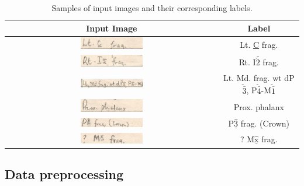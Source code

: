 \documentclass{article}
\begin{document}
\begin{table}[h!]
    \centering
    \begin{tabular}{|c|c|}
        \hline
        \textbf{Input Image} & \textbf{Label} \\
        \hline
        \includegraphics[width=0.3\textwidth]{../images/data_samples/canine.png} & Lt. \underline{C} frag. \\
        \hline
        \includegraphics[width=0.3\textwidth]{../images/data_samples/lowjawincisor.png} & Rt. I$\bar{\check{2}}$ frag. \\
        \hline
        \includegraphics[width=0.3\textwidth]{../images/data_samples/multipleteeth.png} & Lt. Md. frag. wt dP$\check{\bar{3}}$, P$\check{\bar{4}}$-M$\check{\bar{1}}$\\
        \hline
        \includegraphics[width=0.3\textwidth]{../images/data_samples/nontooth.png} & Prox. phalanx \\
        \hline
        \includegraphics[width=0.3\textwidth]{../images/data_samples/smudged.png} & P$\hat{\underline{\text{3}}}$ frag. (Crown) \\
        \hline
        \includegraphics[width=0.3\textwidth]{../images/data_samples/underlinedx.png} & ? M$\hat{\underline{\text{x}}}$ frag. \\
        \hline
    \end{tabular}
    \caption{Samples of input images and their corresponding labels.}
    \label{table:input_images}
\end{table}


\subsection{Data preprocessing}
\end{document}
